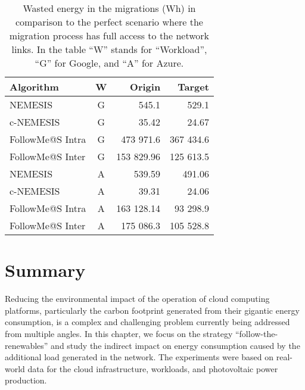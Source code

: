 \begin{table}[h]

\caption{Wasted energy in the migrations (Wh) in comparison to the perfect scenario where the migration process has full access to the network links. In the table ``W'' stands for ``Workload'', ``G'' for Google, and ``A'' for Azure.}\label{tab:wasted_mig} \centering
\begin{tabular}{|l|c|r|r|}
  \hline
  \textbf{Algorithm} & \textbf{W}  & \textbf{Origin} & \textbf{Target}   \\
  \hline
  NEMESIS  & G & 545.1  & 529.1 \\
  \hline
  c-NEMESIS & G & 35.42  & 24.67 \\
  \hline
  FollowMe@S Intra & G & 473 971.6 & 367 434.6 \\
  \hline
  FollowMe@S Inter & G & 153 829.96  & 125 613.5  \\
  \hline
  NEMESIS  & A & 539.59  & 491.06 \\
  \hline
  c-NEMESIS & A &  39.31 & 24.06   \\
  \hline
  FollowMe@S Intra & A & 163 128.14  & 93 298.9  \\
  \hline
  FollowMe@S Inter & A & 175 086.3  & 105 528.8 \\
  \hline

\end{tabular}
\end{table}


\section{Summary} \label{sec:conclusion_smargreens}


Reducing the environmental impact of the operation of cloud computing platforms, particularly the carbon footprint generated from their gigantic energy consumption, is a complex and challenging problem currently being addressed from multiple angles. In this chapter, we focus on the strategy ``follow-the-renewables'' and study the indirect impact on energy consumption caused by the additional load generated in the network. The experiments were based on real-world data for the cloud infrastructure, workloads, and photovoltaic power production.

